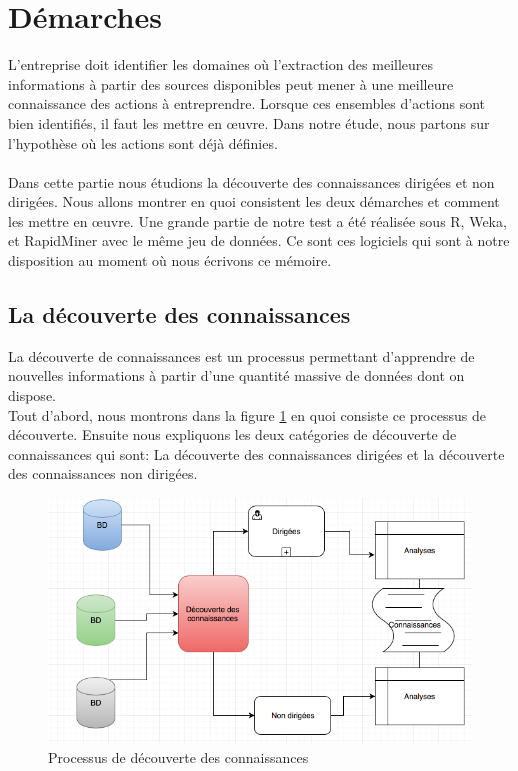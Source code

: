 \documentclass[11pt,a4paper]{report}
\begin{document}
\newpage

\section{Démarches \label{demarche}}
L’entreprise doit identifier les domaines où l’extraction des meilleures informations à partir des sources disponibles peut mener à une meilleure connaissance des actions à entreprendre. Lorsque ces ensembles d’actions sont bien identifiés, il faut les mettre en œuvre. Dans notre étude, nous partons sur l’hypothèse où les actions sont déjà définies.\\\\
Dans cette partie nous étudions la découverte des connaissances dirigées et non dirigées. Nous allons montrer en quoi consistent les deux démarches et comment les mettre en œuvre. Une grande partie de notre test a été réalisée sous R, Weka, et RapidMiner avec le même jeu de données. 
Ce sont ces logiciels qui sont à notre disposition au moment où nous écrivons ce mémoire. 
\subsection{La découverte des connaissances}
La découverte de connaissances est un processus permettant d'apprendre de nouvelles informations à partir d'une quantité massive de données dont on dispose. \\
Tout d'abord, nous montrons dans la figure \ref{figure10} en quoi consiste ce processus de découverte. Ensuite nous expliquons les deux catégories de découverte de connaissances qui sont: La découverte des connaissances dirigées et la découverte des connaissances non dirigées.

%
%
%
\begin{figure}[h]
\centering
\includegraphics[scale=0.50]{kddnew.png}
\caption{Processus de découverte des connaissances}
\label{figure10}
\end{figure}
\end{document}
